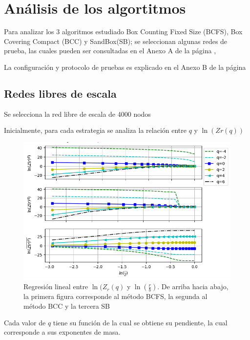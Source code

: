 \section{Análisis de los algortitmos}

Para analizar los 3 algoritmos estudiado Box Counting Fixed Size (BCFS), Box Covering Compact (BCC) y SandBox(SB); se seleccionan algunas redes de prueba, las cuales pueden ser consultadas en el Anexo A de la página \pageref{AnexoA},

La configuración y protocolo de pruebas es explicado en el Anexo B de la página\pageref{AnexoB}


\subsection{Redes libres de escala}

Se selecciona la red libre de escala de 4000 nodos 

Inicialmente, para cada estrategia se analiza la relación entre $q$ y $\ln(Zr(q))$

\begin{figure}[H]
    \centering
    \includegraphics[scale=0.8]{Capitulo4Multifractalidad/imagenes/scaleFree4000_TqLnrBCscaleFree4000Nodes.png}

    \caption{Regresión lineal entre $\ln(Z_r(q)$ y $\ln(\frac{r}{b})$. De arriba hacia abajo, la primera figura corresponde al método BCFS, la segunda al método BCC y la tercera SB}
\end{figure}

Cada valor de $q$ tiene su función de la cual se obtiene su pendiente, la cual corresponde a sus exponentes de masa.

